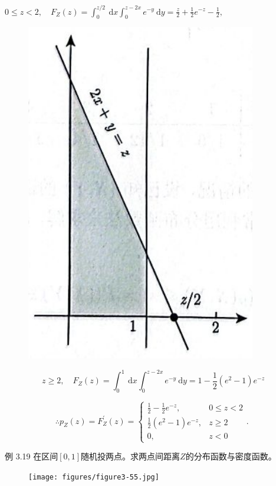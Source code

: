 \documentclass{beamer}
\begin{document}
	\begin{frame}
		$0 \leqslant z<2, \quad F_{Z}(z)=\int_{0}^{z / 2} \mathrm{~d} x \int_{0}^{z-2 x} e^{-y} \mathrm{~d} y=\frac{z}{2}+\frac{1}{2} e^{-z}-\frac{1}{2},$
		
		\begin{figure}
			\centering
			\includegraphics[scale = 0.2]{figures/figure3-54}
		\end{figure}
		$$
		z \geqslant 2, \quad F_{Z}(z)=\int_{0}^{1} \mathrm{~d} x \int_{0}^{z-2 x} e^{-y} \mathrm{~d} y=1-\frac{1}{2}\left(e^{2}-1\right) e^{-z}
		$$
		
		$$
		\therefore p_{Z}(z)=F_{Z}^{\prime}(z)=\left\{\begin{array}{ll}
			\frac{1}{2}-\frac{1}{2} e^{-z}, & 0 \leqslant z<2 \\
			\frac{1}{2}\left(e^{2}-1\right) e^{-z}, & z \geqslant 2 \\
			0, & z<0
		\end{array}\right. \text {. }
		$$
	\end{frame}
	
	\begin{frame}
		例 3.19 在区间$[0, 1]$随机投两点。求两点间距离$Z$的分布函数与密度函数。
		\begin{figure}
			\centering
			\texttt{[image: figures/figure3-55.jpg]}
		\end{figure}
	\end{frame}
	
\end{document}
